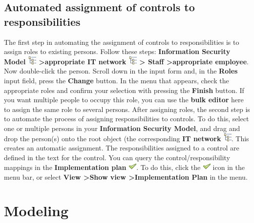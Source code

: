 \documentclass[a4paper,10pt]{book}
\begin{document}
\subsection{Automated assignment of controls to responsibilities}
The first step in automating the assignment of controls to responsibilities is to assign roles to existing persons.
Follow these steps:
\textbf{Information Security Model \includegraphics[height=2ex]{Icon/GS_Modell.png}
\textgreater appropriate IT network \includegraphics[height=2ex]{Icon/GS_Modell.png} \textgreater
Staff \textgreater appropriate employee}. Now double-click the person. Scroll down in the input form and, in the \textbf{Roles}
input field, press the \textbf{Change} button. In the menu that appears, check the appropriate roles and confirm your selection with pressing the
\textbf{Finish} button. If you want multiple people to occupy this role, you can use the \textbf{bulk editor}
here to assign the same role to several persons.
\newline
After assigning roles, the second step is to automate the process of assigning responsibilities to controls. To do this,
select one or multiple persons in your \textbf{Information Security Model}, and drag and drop the person(s) onto the root
object (the corresponding \textbf{IT network \includegraphics[height=2ex]{Icon/GS_Modell.png}}.
This creates an automatic assignment. The responsibilities assigned to a control are defined in the text for the control.
You can query the control/responsibility mappings in the \textbf{Implementation plan} \includegraphics[height=2ex]{Icon/Okay.png}.
To do this, click the \includegraphics[height=2ex]{Icon/Okay.png} icon in the menu bar, or select
\textbf{View \textgreater Show view \textgreater Implementation Plan} in the menu.

\section{Modeling}
\end{document}
